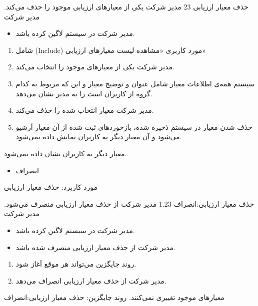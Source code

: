 \usecase
{
حذف معیار ارزیابی
}
{23}
{
	مدیر شرکت یکی از معیارهای ارزیابی موجود را حذف می‌کند.
}
{
	مدیر شرکت
}
{}
{
	\begin{itemize}
		\vspace*{-0.6cm}
		\item 
		مدیر شرکت در سیستم لاگین کرده باشد.
	\end{itemize}
}
{
	\begin{enumerate}
	\item 
	شامل (Include) مورد کاربری «مشاهده لیست معیارهای ارزیابی»
	\item
	مدیر شرکت یکی از معیارهای موجود را انتخاب می‌کند.
	\item 
	سیستم همه‌ی اطلاعات معیار شامل عنوان و توضیح معیار و این که مربوط به کدام گروه از کاربران است را به مدیر نشان می‌دهد.
	\item 
 مدیر شرکت معیار انتخاب شده را حذف می‌کند.
	\item 
حذف شدن معیار در سیستم ذخیره شده، بازخوردهای ثبت شده از آن معیار آرشیو می‌شود و آن معیار دیگر به کاربران نمایش داده نمی‌شود.
\end{enumerate}
}
{
معیار دیگر به کاربران نشان داده نمی‌شود.
}
{
	\begin{itemize}
		\vspace*{-0.6cm}
		\item 
		انصراف
	\end{itemize}
}
{
	مورد کاربرد: حذف معیار ارزیابی
}



\alternativeflow
{
	حذف معیار ارزیابی:انصراف
}
{1.23}
{
	مدیر شرکت از حذف معیار ارزیابی منصرف می‌شود.
}
{
	مدیر شرکت
}
{}
{
	\begin{itemize}
		\vspace*{-0.6cm}
		\item 
		مدیر شرکت در سیستم لاگین کرده باشد.
		\item
		مدیر شرکت از حذف معیار ارزیابی منصرف شده باشد.
	\end{itemize}
}
{
	\vspace*{-0.6cm}
	\begin{enumerate}
		\item 
		روند جایگزین می‌تواند هر موقع آغاز شود.
		\item
		مدیر شرکت از حذف معیار ارزیابی انصراف می‌دهد.
	\end{enumerate}
}
{
	معیارهای موجود تغییری نمی‌کنند.
}
{
	روند جایگزین: حذف معیار ارزیابی:انصراف
}
\newpage
